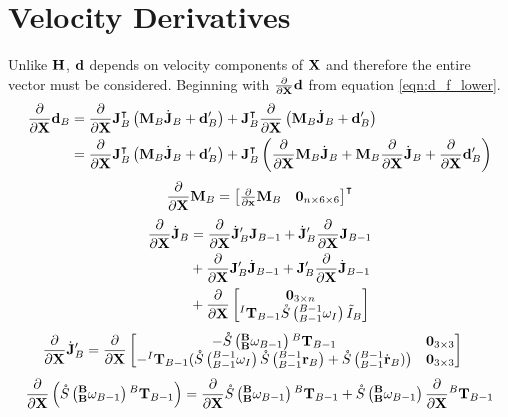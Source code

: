 \section{Velocity Derivatives}
\noindent Unlike $\H$, $\d$ depends on velocity components of $\X$ and therefore the entire vector must be considered. Beginning with $\partialX{}\d$ from equation \ref{eqn:d_f_lower}.
\begin{align} 
        \partialX{}\d_B &= \partialX{}\J\transpose_B \left (\M_B \dotJ_B + \d'_B \right) + \J\transpose_B \partialX{} \left (\M_B \dotJ_B + \d'_B \right) \nonumber\\
        &= \partialX{}\J\transpose_B \left (\M_B \dotJ_B + \d'_B \right) + \J\transpose_B \left (\partialX{} \M_B \dotJ_B + \M_B \partialX{} \dotJ_B + \partialX{} \d'_B \right) \label{eqn:d_d}
\end{align}
\begin{align}
    \partialX{} \M_B = \begin{bmatrix}
    \partialx{}\M_B &
    \ZERO_{n \times 6 \times 6}
    \end{bmatrix}\transpose
\end{align}
\begin{align} 
    \partialX{} \dotJ_B &= \partialX{}\dotJ_B' \J_{B-1} + \dotJ_B' \partialX{}\J_{B-1} \label{eqn:d_dj} \\ \nonumber &+ \partialX{}\J_B' \dotJ_{B-1} + \J_B' \partialX{} \dotJ_{B-1} \\ \nonumber &+ \partialX{}\begin{bmatrix} 
	\ZERO_{3 \times n} \\
	{{^I{\T}_{B-1}}\S{^{B-1}_{B-1}\omega_I}\ITilde_B} \\
	\end{bmatrix}  
\end{align}
\begin{align} \label{eqn:d_djp}
    \partialX{}\dotJ_B' &= \partialX{}\begin{bmatrix}  
	-\S{\BB\omega_{B-1}}{^B\T_{B-1}}                                       & \ZERO_{3 \times 3} \\
	-{^I\T_{B-1}}
	(\S{^{B-1}_{B-1}\omega_I}\S{^{B-1}_{B-1}\r_B}+\S{^{B-1}_{B-1}\dotr_B)} & \ZERO_{3 \times 3} \\
	\end{bmatrix} 
\end{align}
\begin{align} \label{eqn:d_skew_rotation1}
    \partialX{}\left (\S{\BB\omega_{B-1}}{^B\T_{B-1}} \right ) = \partialX{}\S{\BB\omega_{B-1}}{^B\T_{B-1}} + \S{\BB\omega_{B-1}}\partialX{}{^B\T_{B-1}}
\end{align}
